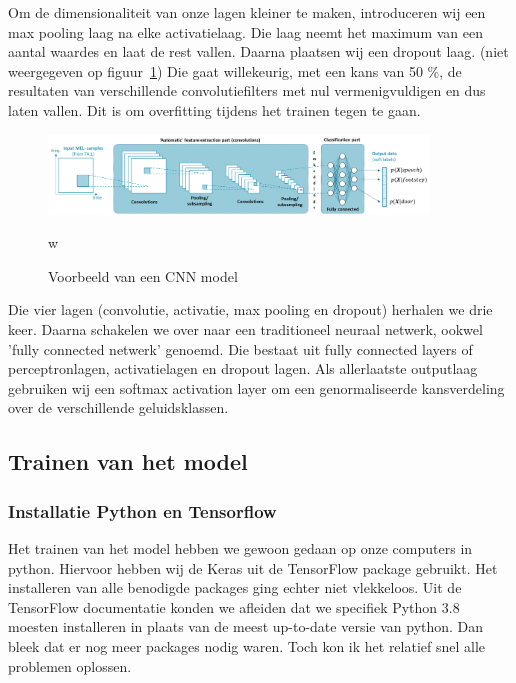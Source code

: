 Om de dimensionaliteit van onze lagen kleiner te maken, introduceren wij een max pooling laag na elke activatielaag. Die laag neemt het maximum van een aantal waardes en laat de rest vallen. Daarna plaatsen wij een dropout laag. (niet weergegeven op figuur~\ref{fig:cnn-model}) Die gaat willekeurig, met een kans van 50 \%, de resultaten van verschillende convolutiefilters met nul vermenigvuldigen en dus laten vallen. Dit is om overfitting tijdens het trainen tegen te gaan.

\begin{figure}[ht]
	\centering
	\includegraphics[width=0.9\textwidth]{figuren/cnn.png}
	\caption{Voorbeeld van een CNN model}w
	\cite{slides:cnn}
	\label{fig:cnn-model}
\end{figure}

Die vier lagen (convolutie, activatie, max pooling en dropout) herhalen we drie keer. Daarna schakelen we over naar een traditioneel neuraal netwerk, ookwel 'fully connected netwerk' genoemd. Die bestaat uit fully connected layers of perceptronlagen, activatielagen en dropout lagen. Als allerlaatste outputlaag gebruiken wij een softmax activation layer om een genormaliseerde kansverdeling over de verschillende geluidsklassen. \cite{enwiki:softmax}


\subsection{Trainen van het model}
\subsubsection{Installatie Python en Tensorflow}
Het trainen van het model hebben we gewoon gedaan op onze computers in python. Hiervoor hebben wij de Keras uit de TensorFlow package gebruikt. Het installeren van alle benodigde packages ging echter niet vlekkeloos. Uit de TensorFlow documentatie konden we afleiden dat we specifiek Python 3.8 moesten installeren in plaats van de meest up-to-date versie van python. Dan bleek dat er nog meer packages nodig waren. Toch kon ik het relatief snel alle problemen oplossen.

